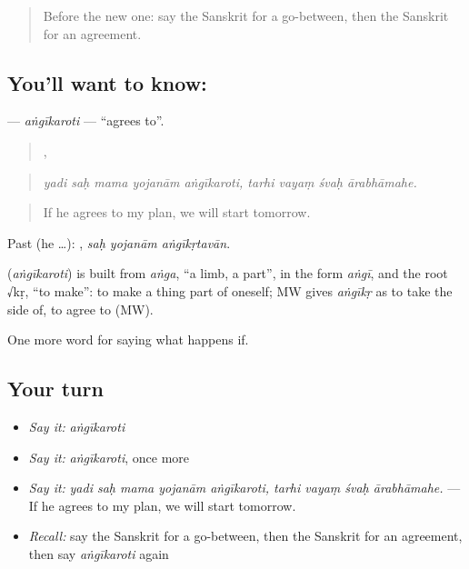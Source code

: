 \label{lesson:SA-C534-angikaroti}



\begin{quote}
Before the new one: say the Sanskrit for a go-between, then the Sanskrit for an agreement.
\end{quote}

\subsection*{You'll want to know: }
\textbf{} — \emph{aṅgīkaroti} — \textquotedblleft{}agrees to\textquotedblright{}.

\begin{quote}
    ,    
\end{quote}

\begin{quote}
\emph{yadi saḥ mama yojanām aṅgīkaroti, tarhi vayaṃ śvaḥ ārabhāmahe.}
\end{quote}

\begin{quote}
If he agrees to my plan, we will start tomorrow.
\end{quote}

Past (he …):   , \emph{saḥ yojanām aṅgīkṛtavān}.

\begin{cousinweb}
\textbf{} (\emph{aṅgīkaroti}) is built from \emph{aṅga}, \textquotedblleft{}a limb, a part\textquotedblright{}, in the form \emph{aṅgī}, and the root √kṛ, \textquotedblleft{}to make\textquotedblright{}: to make a thing part of oneself; MW gives \emph{aṅgīkṛ} as to take the side of, to agree to (MW).
\end{cousinweb}

\begin{grammarlens}[title={What you've built}]
One more word for saying what happens if.
\end{grammarlens}

\subsection*{Your turn}
\begin{itemize}
\raggedright
  \item \emph{Say it:} \emph{aṅgīkaroti}
  \item \emph{Say it:} \emph{aṅgīkaroti}, once more
  \item \emph{Say it:} \emph{yadi saḥ mama yojanām aṅgīkaroti, tarhi vayaṃ śvaḥ ārabhāmahe.} — If he agrees to my plan, we will start tomorrow.
  \item \emph{Recall:} say the Sanskrit for a go-between, then the Sanskrit for an agreement, then say \emph{aṅgīkaroti} again
\end{itemize}

